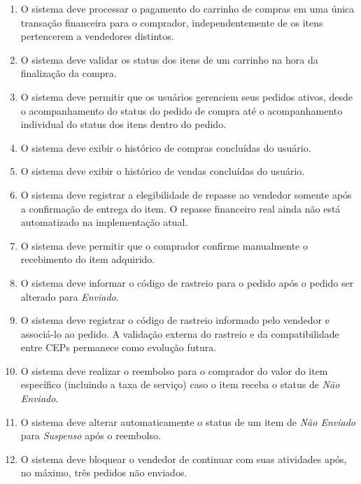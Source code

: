 ﻿\documentclass[12pt,a4paper]{article}
\begin{document}
\begin{enumerate}[label=RF\arabic*:]
    \item O sistema deve processar o pagamento do carrinho de compras em uma única transação financeira para o comprador, independentemente de os itens pertencerem a vendedores distintos.

    \item O sistema deve validar os status dos itens de um carrinho na hora da finalização da compra.

    \item O sistema deve permitir que os usuários gerenciem seus pedidos ativos, desde o acompanhamento do status do pedido de compra até o acompanhamento individual do status dos itens dentro do pedido.

    \item O sistema deve exibir o histórico de compras concluídas do usuário.

    \item O sistema deve exibir o histórico de vendas concluídas do usuário.

    \item O sistema deve registrar a elegibilidade de repasse ao vendedor somente após a confirmação de entrega do item. O repasse financeiro real ainda não está automatizado na implementação atual.

    \item O sistema deve permitir que o comprador confirme manualmente o recebimento do item adquirido. 

    \item O sistema deve informar o código de rastreio para o pedido após o pedido ser alterado para \textit{Enviado}.

    \item O sistema deve registrar o código de rastreio informado pelo vendedor e associá-lo ao pedido. A validação externa do rastreio e da compatibilidade entre CEPs permanece como evolução futura.

    \item O sistema deve realizar o reembolso para o comprador do valor do item específico  (incluindo a taxa de serviço) caso o item receba o status de \textit{Não Enviado}. 

    \item O sistema deve alterar automaticamente o status de um item de \textit{Não Enviado} para \textit{Suspenso} após o reembolso.

    \item O sistema deve bloquear o vendedor de continuar com suas atividades após, no máximo, três pedidos não enviados.


\end{enumerate}
\end{document}
